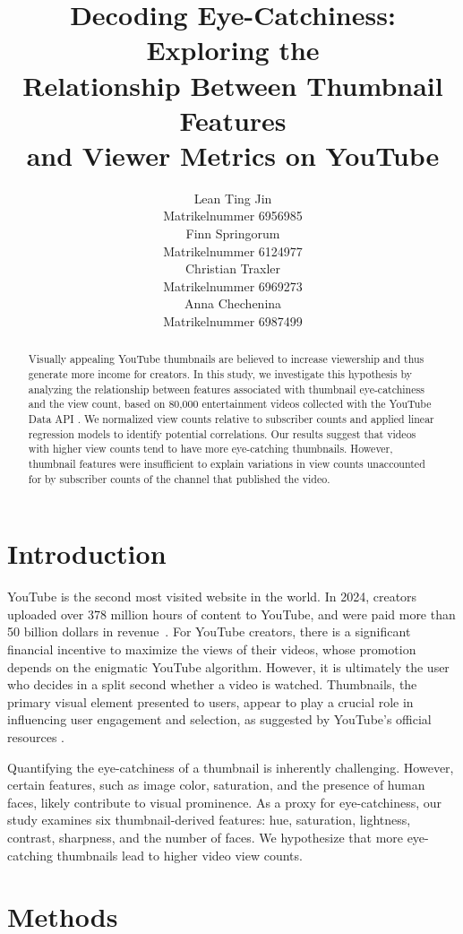 \documentclass{article}
\title{Decoding Eye-Catchiness: Exploring the\\Relationship Between Thumbnail Features\\and Viewer Metrics on YouTube}
\author{%
  Lean Ting Jin\\
  Matrikelnummer 6956985\\
  \And
  Finn Springorum\\
  Matrikelnummer 6124977\\
  \AND
  Christian Traxler\\
  Matrikelnummer 6969273\\
  \And
  Anna Chechenina\\
  Matrikelnummer 6987499\\
}
\begin{document}
\maketitle

\begin{abstract}
Visually appealing YouTube thumbnails are believed to increase viewership and thus generate more income for creators. In this study, we investigate this hypothesis by analyzing the relationship between features associated with thumbnail eye-catchiness and the view count, based on 80,000 entertainment videos collected with the YouTube Data API \cite{youtubeapi}. We normalized view counts relative to subscriber counts and applied linear regression models to identify potential correlations. Our results suggest that videos with higher view counts tend to have more eye-catching thumbnails. However, thumbnail features were insufficient to explain variations in view counts unaccounted for by subscriber counts of the channel that published the video.
\end{abstract}

\section{Introduction}
YouTube is the second most visited website in the world. In 2024, creators uploaded over 378 million hours of content to YouTube, and were paid more than 50 billion dollars in revenue~\cite{youtube-stats}. For YouTube creators, there is a significant financial incentive to maximize the views of their videos, whose promotion depends on the enigmatic YouTube algorithm. However, it is ultimately the user who decides in a split second whether a video is watched. Thumbnails, the primary visual element presented to users, appear to play a crucial role in influencing user engagement and selection, as suggested by YouTube's official resources \cite{YouTubeThumbnail}.

Quantifying the eye-catchiness of a thumbnail is inherently challenging. However, certain features, such as image color, saturation, and the presence of human faces, likely contribute to visual prominence. As a proxy for eye-catchiness, our study examines six thumbnail-derived features: hue, saturation, lightness, contrast, sharpness, and the number of faces. We hypothesize that more eye-catching thumbnails lead to higher video view counts.

\section{Methods}
\end{document}
